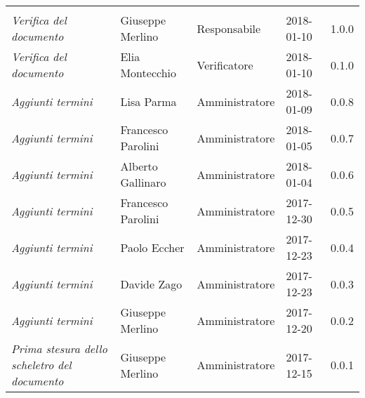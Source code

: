 \newpage 
\section*{}
\begin{table}[H]
	\centering
	\begin{tabular}{p{4cm}|C{3cm}|C{3cm}|R{2.5cm}|R{2cm}}
		
		 & & & & \\
		
		
		\emph{Verifica del documento} & Giuseppe Merlino & Responsabile & 2018-01-10 & 1.0.0 \\
		\hline
		
		\emph{Verifica del documento} & Elia Montecchio & Verificatore & 2018-01-10 & 0.1.0 \\
		\hline
		
		\emph{Aggiunti termini} & Lisa Parma & Amministratore & 2018-01-09 & 0.0.8 \\
		\hline
		
		\emph{Aggiunti termini} & Francesco Parolini & Amministratore & 2018-01-05 & 0.0.7 \\
		\hline
		
		\emph{Aggiunti termini} & Alberto Gallinaro & Amministratore & 2018-01-04 & 0.0.6 \\
		\hline
		
		\emph{Aggiunti termini} & Francesco Parolini & Amministratore & 2017-12-30 & 0.0.5 \\
		\hline
		
		\emph{Aggiunti termini} & Paolo Eccher & Amministratore & 2017-12-23 & 0.0.4 \\
		\hline
		
		\emph{Aggiunti termini} & Davide Zago & Amministratore & 2017-12-23 & 0.0.3 \\
		\hline
		
		\emph{Aggiunti termini} & Giuseppe Merlino & Amministratore & 2017-12-20 & 0.0.2 \\
		\hline
		
		\emph{Prima stesura dello scheletro del documento} & Giuseppe Merlino & Amministratore & 2017-12-15 & 0.0.1 \\
		
	\end{tabular}
	
\end{table}


\clearpage